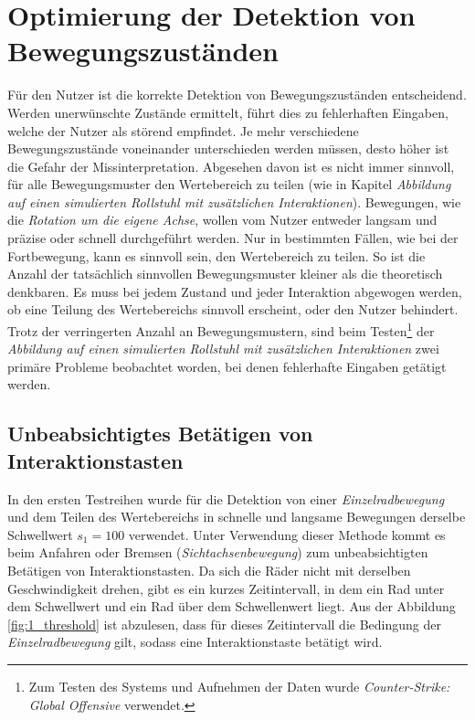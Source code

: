 \section{Optimierung der Detektion von Bewegungszuständen}
Für den Nutzer ist die korrekte Detektion von Bewegungszuständen entscheidend.
Werden unerwünschte Zustände ermittelt, führt dies zu fehlerhaften Eingaben, welche der Nutzer als störend empfindet.
Je mehr verschiedene Bewegungszustände voneinander unterschieden werden müssen, desto höher ist die Gefahr der Missinterpretation.
Abgesehen davon ist es nicht immer sinnvoll, für alle Bewegungsmuster den Wertebereich zu teilen (wie in Kapitel \textit{Abbildung auf einen simulierten Rollstuhl mit zusätzlichen Interaktionen}).
Bewegungen, wie die \textit{Rotation um die eigene Achse}, wollen vom Nutzer entweder langsam und präzise oder schnell durchgeführt werden.
Nur in bestimmten Fällen, wie bei der Fortbewegung, kann es sinnvoll sein, den Wertebereich zu teilen.
So ist die Anzahl der tatsächlich sinnvollen Bewegungsmuster kleiner als die theoretisch denkbaren.
Es muss bei jedem Zustand und jeder Interaktion abgewogen werden, ob eine Teilung des Wertebereichs sinnvoll erscheint, oder den Nutzer behindert.
Trotz der verringerten Anzahl an Bewegungsmustern, sind beim Testen\footnote{Zum Testen des Systems und Aufnehmen der Daten wurde \textit{Counter-Strike: Global Offensive} verwendet.} der \textit{Abbildung auf einen simulierten Rollstuhl mit zusätzlichen Interaktionen} zwei primäre Probleme beobachtet worden, bei denen fehlerhafte Eingaben getätigt werden.

\subsection{Unbeabsichtigtes Betätigen von Interaktionstasten}
In den ersten Testreihen wurde für die Detektion von einer \textit{Einzelradbewegung} und dem Teilen des Wertebereichs in schnelle und langsame Bewegungen derselbe Schwellwert $s_1 = 100$ verwendet.
Unter Verwendung dieser Methode kommt es beim Anfahren oder Bremsen (\textit{Sichtachsenbewegung}) zum unbeabsichtigten Betätigen von Interaktionstasten.
Da sich die Räder nicht mit derselben Geschwindigkeit drehen, gibt es ein kurzes Zeitintervall, in dem ein Rad unter dem Schwellwert und ein Rad über dem Schwellenwert liegt.
Aus der Abbildung \ref{fig:1_threshold} ist abzulesen, dass für dieses Zeitintervall die Bedingung der \textit{Einzelradbewegung} gilt, sodass eine Interaktionstaste betätigt wird.


